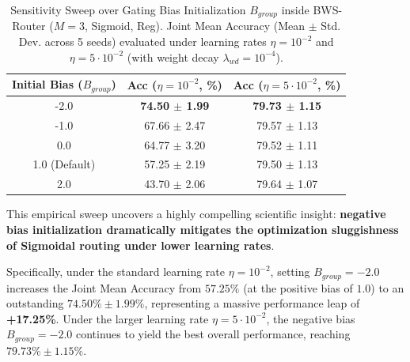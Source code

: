 \begin{table}[h]
\caption{Sensitivity Sweep over Gating Bias Initialization $B_{group}$ inside BWS-Router ($M=3$, Sigmoid, Reg). Joint Mean Accuracy (Mean $\pm$ Std. Dev. across 5 seeds) evaluated under learning rates $\eta = 10^{-2}$ and $\eta = 5 \cdot 10^{-2}$ (with weight decay $\lambda_{wd} = 10^{-4}$).}
\label{tab:bias_sweep}
\vskip 0.15in
\begin{center}
\begin{small}
\begin{tabular}{ccc}
\toprule
\textbf{Initial Bias ($B_{group}$)} & \textbf{Acc ($\eta = 10^{-2}$, \%)} & \textbf{Acc ($\eta = 5 \cdot 10^{-2}$, \%)} \\
\midrule
-2.0 & \textbf{74.50 $\pm$ 1.99} & \textbf{79.73 $\pm$ 1.15} \\
-1.0 & 67.66 $\pm$ 2.47 & 79.57 $\pm$ 1.13 \\
0.0 & 64.77 $\pm$ 3.20 & 79.52 $\pm$ 1.11 \\
1.0 (Default) & 57.25 $\pm$ 2.19 & 79.50 $\pm$ 1.13 \\
2.0 & 43.70 $\pm$ 2.06 & 79.64 $\pm$ 1.07 \\
\bottomrule
\end{tabular}
\end{small}
\end{center}
\vskip -0.1in
\end{table}

This empirical sweep uncovers a highly compelling scientific insight: \textbf{negative bias initialization dramatically mitigates the optimization sluggishness of Sigmoidal routing under lower learning rates}. 

Specifically, under the standard learning rate $\eta = 10^{-2}$, setting $B_{group} = -2.0$ increases the Joint Mean Accuracy from $57.25\%$ (at the positive bias of $1.0$) to an outstanding $74.50\% \pm 1.99\%$, representing a massive performance leap of \textbf{+17.25\%}. Under the larger learning rate $\eta = 5 \cdot 10^{-2}$, the negative bias $B_{group} = -2.0$ continues to yield the best overall performance, reaching $79.73\% \pm 1.15\%$.

